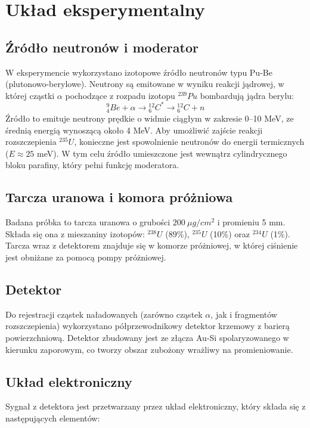 \documentclass[a4paper,12pt]{article}
\begin{document}
\section{Układ eksperymentalny}

\subsection{Źródło neutronów i moderator}
W eksperymencie wykorzystano izotopowe źródło neutronów typu Pu-Be (plutonowo-berylowe). Neutrony są emitowane w wyniku reakcji jądrowej, w której cząstki $\alpha$ pochodzące z rozpadu izotopu ${}^{239}Pu$ bombardują jądra berylu:
\begin{equation}
{}_{4}^{9}Be + \alpha \rightarrow {}_{6}^{12}C^* \rightarrow {}_{6}^{12}C + n
\end{equation}
Źródło to emituje neutrony prędkie o widmie ciągłym w zakresie 0--10 MeV, ze średnią energią wynoszącą około 4 MeV. Aby umożliwić zajście reakcji rozszczepienia ${}^{235}U$, konieczne jest spowolnienie neutronów do energii termicznych ($E \approx 25$ meV). W tym celu źródło umieszczone jest wewnątrz cylindrycznego bloku parafiny, który pełni funkcję moderatora.

\subsection{Tarcza uranowa i komora próżniowa}
Badana próbka to tarcza uranowa o grubości $200~\mu g/cm^{2}$ i promieniu 5 mm. Składa się ona z mieszaniny izotopów: ${}^{238}U$ (89\%), ${}^{235}U$ (10\%) oraz ${}^{234}U$ (1\%). Tarcza wraz z detektorem znajduje się w komorze próżniowej, w której ciśnienie jest obniżane za pomocą pompy próżniowej.

\subsection{Detektor}
Do rejestracji cząstek naładowanych (zarówno cząstek $\alpha$, jak i fragmentów rozszczepienia) wykorzystano półprzewodnikowy detektor krzemowy z barierą powierzchniową. Detektor zbudowany jest ze złącza Au-Si spolaryzowanego w kierunku zaporowym, co tworzy obszar zubożony wrażliwy na promieniowanie.

\subsection{Układ elektroniczny}
Sygnał z detektora jest przetwarzany przez układ elektroniczny, który składa się z następujących elementów:
\end{document}
